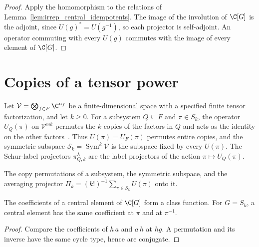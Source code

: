 \begin{proof}\leanok
    Apply the homomorphism to the relations of
    Lemma~\ref{lem:irrep_central_idempotents}. The image of the involution of
    $\C[G]$ is the adjoint, since $U(g)^\ast=U(g^{-1})$, so each projector is
    self-adjoint. An operator commuting with every $U(g)$ commutes with the
    image of every element of $\C[G]$.
\end{proof}

\section{Copies of a tensor power}

Let $\mathcal V=\bigotimes_{f\in F}\C^{n_f}$ be a finite-dimensional space
with a specified finite tensor factorization, and let $k\ge0$. For a subsystem
$Q\subseteq F$ and $\pi\in S_k$, the operator $U_Q(\pi)$ on
$\mathcal V^{\otimes k}$ permutes the $k$ copies of the factors in $Q$ and acts
as the identity on the other factors~\cite[Section~6]{OpenAI2026AreaLaw}.
Thus $U(\pi)=U_F(\pi)$ permutes entire copies, and the symmetric subspace
$\mathcal S_k=\operatorname{Sym}^k\mathcal V$ is the subspace fixed by every $U(\pi)$. The
Schur-label projectors $\pi^\lambda_{Q,k}$ are the label projectors of the
action $\pi\mapsto U_Q(\pi)$.

\begin{definition}
    \label{def:copy_permutations}
    \leanok
    The copy permutations of a subsystem, the symmetric subspace, and the
    averaging projector $\Pi_k=(k!)^{-1}\sum_{\pi\in S_k}U(\pi)$ onto it.
\end{definition}

\begin{lemma}
    \label{lem:symmetric_central_inverse}
    \leanok
    The coefficients of a central element of $\C[G]$ form a class function.
    For $G=S_k$, a central element has the same coefficient at $\pi$ and at
    $\pi^{-1}$.
\end{lemma}

\begin{proof}\leanok
    Compare the coefficients of $h\,a$ and $a\,h$ at $hg$. A permutation and
    its inverse have the same cycle type, hence are conjugate.
\end{proof}

